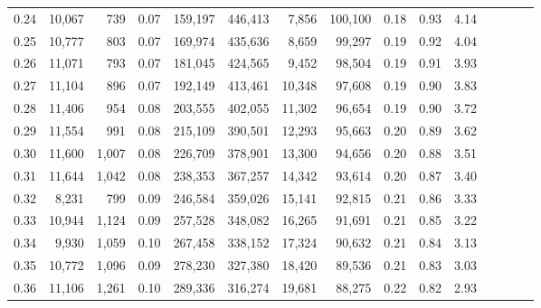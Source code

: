 \begin{tabular}{rrrcrrrrrrrrrrr}
0.24 &  10,067 &    739 &                                       0.07 &  159,197 &  446,413 &    7,856 &  100,100 &  0.18 &  0.93 &                         4.14 \\
0.25 &  10,777 &    803 &                                       0.07 &  169,974 &  435,636 &    8,659 &   99,297 &  0.19 &  0.92 &                         4.04 \\
0.26 &  11,071 &    793 &                                       0.07 &  181,045 &  424,565 &    9,452 &   98,504 &  0.19 &  0.91 &                         3.93 \\
0.27 &  11,104 &    896 &                                       0.07 &  192,149 &  413,461 &   10,348 &   97,608 &  0.19 &  0.90 &                         3.83 \\
0.28 &  11,406 &    954 &                                       0.08 &  203,555 &  402,055 &   11,302 &   96,654 &  0.19 &  0.90 &                         3.72 \\
0.29 &  11,554 &    991 &                                       0.08 &  215,109 &  390,501 &   12,293 &   95,663 &  0.20 &  0.89 &                         3.62 \\
0.30 &  11,600 &  1,007 &                                       0.08 &  226,709 &  378,901 &   13,300 &   94,656 &  0.20 &  0.88 &                         3.51 \\
0.31 &  11,644 &  1,042 &                                       0.08 &  238,353 &  367,257 &   14,342 &   93,614 &  0.20 &  0.87 &                         3.40 \\
0.32 &   8,231 &    799 &                                       0.09 &  246,584 &  359,026 &   15,141 &   92,815 &  0.21 &  0.86 &                         3.33 \\
0.33 &  10,944 &  1,124 &                                       0.09 &  257,528 &  348,082 &   16,265 &   91,691 &  0.21 &  0.85 &                         3.22 \\
0.34 &   9,930 &  1,059 &                                       0.10 &  267,458 &  338,152 &   17,324 &   90,632 &  0.21 &  0.84 &                         3.13 \\
0.35 &  10,772 &  1,096 &                                       0.09 &  278,230 &  327,380 &   18,420 &   89,536 &  0.21 &  0.83 &                         3.03 \\
0.36 &  11,106 &  1,261 &                                       0.10 &  289,336 &  316,274 &   19,681 &   88,275 &  0.22 &  0.82 &                         2.93 \\

\end{tabular}
